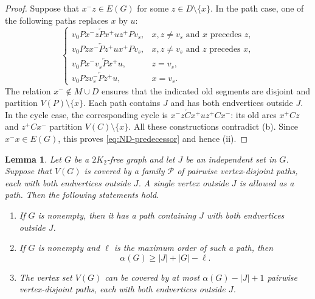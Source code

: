 \documentclass[11pt]{article}
\numberwithin{equation}{section}
\newtheorem{lemma}[theorem]{Lemma}
\theoremstyle{plain}
\theoremstyle{definition}
\theoremstyle{plain}
\begin{document}
\begin{proof}
Suppose that $x^-z\in E(G)$ for some $z\in D\setminus\{x\}$.
In the path case, one of the following paths replaces $x$ by $u$:
\[
\begin{cases}
 v_0P x^-z\overleftarrow P x^+uz^+P v_s,
   &x,z\neq v_s\text{ and }x\text{ precedes }z,\\
 v_0P zx^-\overleftarrow P z^+ux^+P v_s,
   &x,z\neq v_s\text{ and }z\text{ precedes }x,\\
 v_0P x^-v_s\overleftarrow P x^+u,
   &z=v_s,\\
 v_0P zv_s^-\overleftarrow P z^+u,
   &x=v_s.
\end{cases}
\]
The relation $x^-\notin M\cup D$ ensures that the indicated old
segments are disjoint and partition $V(P)\setminus\{x\}$.
Each path contains $J$ and has both endvertices outside $J$.
In the cycle case, the corresponding cycle is
$x^-z\overleftarrow C x^+uz^+C x^-$: its old arcs $x^+Cz$ and
$z^+Cx^-$ partition $V(C)\setminus\{x\}$. All these constructions
contradict (b). Since $x^-x\in E(G)$, this proves
\eqref{eq:ND-predecessor} and hence (ii).
\end{proof}

\begin{lemma}\label{lem:path}
Let $G$ be a $2K_2$-free graph and let $J$ be an independent set
in $G$. Suppose that $V(G)$ is covered by a family $\mathcal P$
of pairwise vertex-disjoint paths, each with both endvertices
outside $J$. A single vertex outside $J$ is allowed as a path.
Then the following statements hold.
\begin{enumerate}[label=\textup{(\roman*)},nosep]
    \item If $G$ is nonempty, then it has a path containing
    $J$ with both endvertices outside $J$.

    \item If $G$ is nonempty and $\ell$ is the maximum order
    of such a path, then
    \begin{equation}\label{eq:path-bound}
        \alpha(G)\geq |J|+|G|-\ell.
    \end{equation}

    \item The vertex set $V(G)$ can be covered by at most
    $\alpha(G)-|J|+1$ pairwise vertex-disjoint paths, each with
    both endvertices outside $J$.
\end{enumerate}
\end{lemma}
\end{document}
